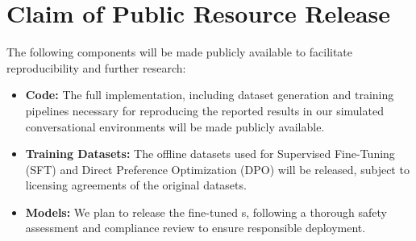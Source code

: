 

\section*{Claim of Public Resource Release}
\label{app:opensource}
The following components will be made publicly available to facilitate reproducibility and further research:
\begin{itemize} \item \textbf{Code:} The full implementation, including dataset generation and training pipelines necessary for reproducing the reported results in our simulated conversational environments
will be made publicly available.
\item \textbf{Training Datasets:} The offline datasets used for Supervised Fine-Tuning (SFT) and Direct Preference Optimization (DPO) will be released, subject to licensing agreements of the original datasets.
\item \textbf{Models:} We plan to release the fine-tuned \name{}s, following a thorough safety assessment and compliance review to ensure responsible deployment.
\end{itemize}
